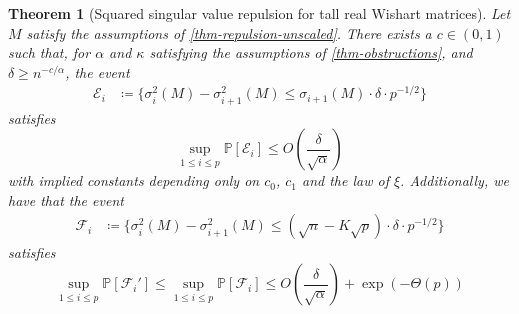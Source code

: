 \documentclass[11pt]{article}
\numberwithin{equation}{section}
\newtheorem{theorem}{Theorem}[section]
\theoremstyle{remark}
\newcommand{\event}{\mathcal{E}}
\begin{document}
\begin{theorem}[Squared singular value repulsion for tall real Wishart matrices]\label{theorem-repulsion-singular-vals-squared-real}
    Let $M$ satisfy the assumptions of \cref{thm-repulsion-unscaled}. There exists a $c \in (0, 1)$ such that, for $\alpha$ and $\kappa$ satisfying the assumptions of \cref{thm-obstructions}, and $\delta \geq n^{-c/\alpha}$, the event
    \begin{align*}
        \event_i &\coloneqq \{ \sigma_i^2(M) - \sigma_{i + 1}^2(M) \leq \sigma_{i + 1}(M) \cdot \delta \cdot p^{-1/2} \}
    \end{align*}
    satisfies
    \begin{equation}
         \sup_{1 \leq i \leq p}\mathbb{P}[\event_i] \leq O( \frac{\delta}{\sqrt{\alpha}})
    \end{equation}
    with implied constants depending only on $c_0$, $c_1$ and the law of $\xi$. Additionally, we have that the event
    \begin{align*}
        \mathcal{F}_i &\coloneqq \{ \sigma_i^2(M) - \sigma_{i + 1}^2(M) \leq (\sqrt{n} - K\sqrt{p}) \cdot \delta \cdot p^{-1/2} \}
    \end{align*}
    satisfies
    \begin{equation}
         \sup_{1 \leq i \leq p}\mathbb{P}[\mathcal{F}_i']  \leq \sup_{1 \leq i \leq p}\mathbb{P}[\mathcal{F}_i] \leq O( \frac{\delta}{\sqrt{\alpha}}) + \exp(-\Theta(p))
    \end{equation}
\end{theorem}
\end{document}
